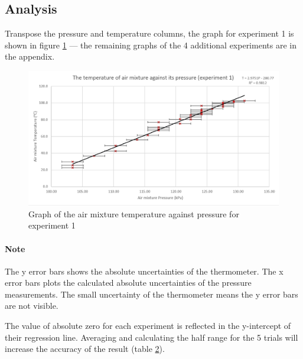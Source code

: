\documentclass[a4paper,12pt]{article}
\begin{document}
\subsection{Analysis}

Transpose the pressure and temperature columns, the graph for experiment 1 is shown in figure \ref{fig:t1} --- the remaining graphs of the 4 additional experiments are in the appendix.

\begin{figure}[H]
    \centering
    \includegraphics[width=\textwidth]{assets/graph1.png}
    \caption{Graph of the air mixture temperature against pressure for experiment 1}
    \label{fig:t1}
\end{figure}

\paragraph{Note} The y error bars shows the absolute uncertainties of the thermometer. The x error bars plots the calculated absolute uncertainties of the pressure measurements. The small uncertainty of the thermometer means the y error bars are not visible.

The value of absolute zero for each experiment is reflected in the y-intercept of their regression line. Averaging and calculating the half range for the 5 trials will increase the accuracy of the result (table \ref{fig:yi}).

\begin{figure}[H]
    \centering
    \label{fig:yi}
\end{figure}
\end{document}
